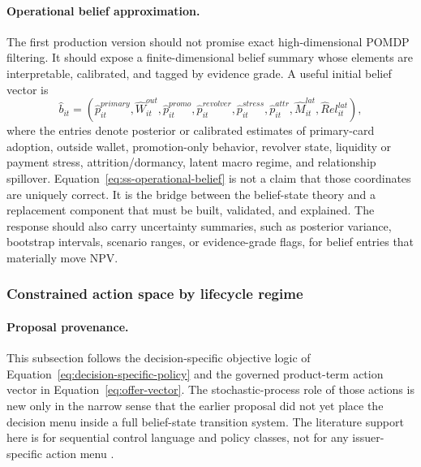 \documentclass[11pt]{article}
\newcommand{\1}{\mathbf{1}}
\begin{document}
\paragraph{Operational belief approximation.}
The first production version should not promise exact high-dimensional POMDP
filtering. It should expose a finite-dimensional belief summary whose elements
are interpretable, calibrated, and tagged by evidence grade. A useful initial
belief vector is
\begin{equation}
  \widehat b_{it}
  =
  (\widehat p^{primary}_{it},\widehat W^{out}_{it},
   \widehat p^{promo}_{it},\widehat p^{revolver}_{it},
   \widehat p^{stress}_{it},\widehat p^{attr}_{it},
   \widehat M^{lat}_{it},\widehat Rel^{lat}_{it}),
  \label{eq:ss-operational-belief}
\end{equation}
where the entries denote posterior or calibrated estimates of primary-card
adoption, outside wallet, promotion-only behavior, revolver state, liquidity or
payment stress, attrition/dormancy, latent macro regime, and relationship
spillover. Equation~\eqref{eq:ss-operational-belief} is not a claim that those
coordinates are uniquely correct. It is the bridge between the belief-state
theory and a replacement component that must be built, validated, and explained.
The response should also carry uncertainty summaries, such as posterior
variance, bootstrap intervals, scenario ranges, or evidence-grade flags, for
belief entries that materially move NPV.

\subsubsection{Constrained action space by lifecycle regime}
\label{subsec:state-space-action-space}

\paragraph{Proposal provenance.}
This subsection follows the decision-specific objective logic of
Equation~\eqref{eq:decision-specific-policy} and the governed product-term
action vector in Equation~\eqref{eq:offer-vector}. The stochastic-process role
of those actions is new only in the narrow sense that the earlier proposal did
not yet place the decision menu inside a full belief-state transition system.
The literature support here is for sequential control language and policy
classes, not for any issuer-specific action menu
\citep{puterman1994mdp,murphy2003dynamic,trench2003bankone}.
\end{document}
